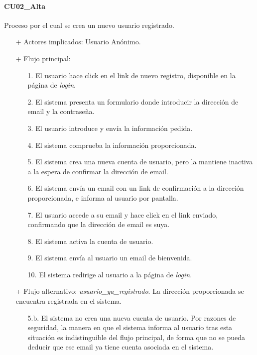 \documentclass[a4paper,12pt,twoside,openright]{report}
\begin{document}
            \paragraph{CU02\_Alta}
            Proceso por el cual se crea un nuevo usuario registrado.
            \begin{itemize}
                \item[+] Actores implicados: Usuario Anónimo.
                \item[+] Flujo principal:
                \begin{enumerate}
                    \item[1.] El usuario hace click en el link de nuevo registro, disponible en la página de \emph{login}.
                    \item[2.] El sistema presenta un formulario donde introducir la dirección de email y la contraseña.
                    \item[3.] El usuario introduce y envía la información pedida.
                    \item[4.] El sistema comprueba la información proporcionada.
                    \item[5.] El sistema crea una nueva cuenta de usuario, pero la mantiene inactiva a la espera de confirmar la dirección de email.
                    \item[6.] El sistema envía un email con un link de confirmación a la dirección proporcionada, e informa al usuario por pantalla.
                    \item[7.] El usuario accede a su email y hace click en el link enviado, confirmando que la dirección de email es suya.
                    \item[8.] El sistema activa la cuenta de usuario.
                    \item[9.] El sistema envía al usuario un email de bienvenida.
                    \item[10.] El sistema redirige al usuario a la página de \emph{login}.
                \end{enumerate}
                \item[+] Flujo alternativo: \emph{usuario\_ya\_registrado}. La dirección proporcionada se encuentra registrada en el sistema.
                \begin{itemize}
                    \item[5.b.] El sistema no crea una nueva cuenta de usuario. Por razones de seguridad, la manera en que el sistema informa al usuario tras esta situación es indistinguible del flujo principal, de forma que no se pueda deducir que ese email ya tiene cuenta asociada en el sistema.

\end{itemize}
\end{itemize}
\end{document}
